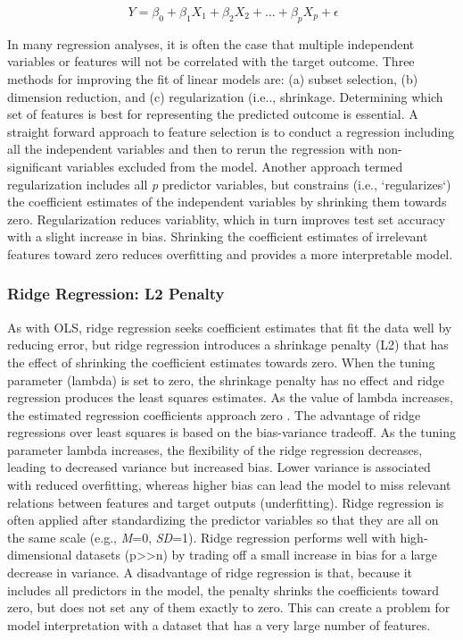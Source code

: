 \documentclass[sigconf]{acmart}
\begin{document}
\begin{equation}
  \ Y = \beta_0 + \beta_1X_1 + \beta_2X_2 +... + \beta_pX_p + \epsilon
\end{equation}


In many regression analyses, it is often the case that multiple independent 
variables or features will not be correlated with the target outcome. Three 
methods for improving the fit of linear models are: (a) subset selection, 
(b) dimension reduction, and (c) regularization (i.e.., shrinkage. Determining 
which set of features is best for representing the predicted outcome is 
essential. A straight forward approach to feature selection is to conduct a 
regression including all the independent variables and then to rerun the 
regression with non-significant variables excluded from the model.
Another approach termed regularization includes all \textit{p} predictor 
variables, but constrains (i.e., `regularizes`) the coefficient estimates of 
the independent variables by shrinking them towards zero. Regularization 
reduces variablity, which in turn improves test set accuracy with a slight 
increase in bias. Shrinking the coefficient estimates of irrelevant features 
toward zero reduces overfitting and provides a more interpretable model. 


\subsubsection{Ridge Regression: L2 Penalty} 

As with OLS, ridge regression seeks coefficient estimates that fit the data 
well by reducing error, but ridge regression introduces a shrinkage penalty
(L2) that has the effect of shrinking the coefficient estimates towards zero. 
When the tuning parameter (lambda) is set to zero, the shrinkage penalty has 
no effect and ridge regression produces the least squares estimates. As the 
value of lambda increases, the estimated regression coefficients approach zero 
\cite{statlearn13}. The advantage of ridge regressions over least squares is 
based on the bias-variance tradeoff. As the tuning parameter lambda increases, 
the flexibility of the ridge regression decreases, leading to decreased variance 
but increased bias. Lower variance is associated with reduced overfitting, 
whereas higher bias can lead the model to miss relevant relations between
features and target outputs (underfitting). Ridge regression is often applied 
after standardizing the predictor variables so that they are all on the same 
scale (e.g., \textit{M}=0, \textit{SD}=1). Ridge regression performs well with
high-dimensional datasets (p>>n) by trading off a small increase in bias for a 
large decrease in variance. A disadvantage of ridge regression is that, because 
it includes all predictors in the model, the penalty shrinks the coefficients 
toward zero, but does not set any of them exactly to zero. This can create a 
problem for model interpretation with a dataset that has a very large number
of features. 
\end{document}
